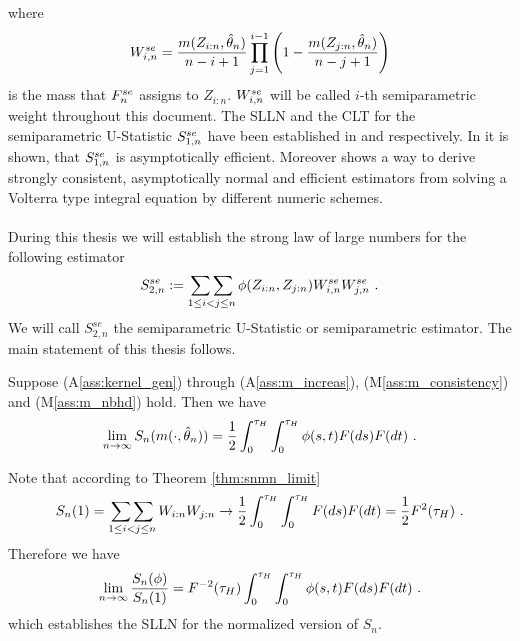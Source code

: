 where 
$$W_{i,n}^{se} = \frac{m(Z_{i:n}, \hat{\theta}_n)}{n-i+1} \prod\limits_{j=1}^{i-1}\left(1-\frac{m(Z_{j:n}, \hat{\theta}_n)}{n-j+1}\right)$$
is the mass that $F_n^{se}$ assigns to $Z_{i:n}$. $W_{i,n}^{se}$ will be called $i$-th semiparametric weight throughout this document. The SLLN and the CLT for the semiparametric U-Statistic $S_{1,n}^{se}$ have been established in \citet{dikta2000strong} and \citet{dikta2005central} respectively. In \cite{dikta2014efficient} it is shown, that  $S_{1,n}^{se}$ is asymptotically efficient. Moreover \cite{dikta2016volterra} shows a way to derive strongly consistent, asymptotically normal and efficient estimators from solving a Volterra type integral equation by different numeric schemes.\\
\\
During this thesis we will establish the strong law of large numbers for the following estimator
$$S_{2,n}^{se} := \mathop{\sum\sum}\limits_{1\leq i<j\leq n}\phi(Z_{i:n}, Z_{j:n})W_{i,n}^{se}W_{j,n}^{se}\textrm{ .}$$
We will call $S_{2,n}^{se}$ the semiparametric U-Statistic or semiparametric estimator. The main statement of this thesis follows.
\begin{thm}
	Suppose (A\ref{ass:kernel_gen}) through (A\ref{ass:m_increas}), (M\ref{ass:m_consistency}) and (M\ref{ass:m_nbhd}) hold. Then we have
	$$\lim\limits_{n\to\infty} S_n(m(\cdot, \hat{\theta}_n)) = \frac{1}{2}\int_{0}^{\tau_H}\int_{0}^{\tau_H} \phi(s,t) F(ds)F(dt)\textrm{ .}$$
	\label{thm:snmn_limit}
\end{thm}
%
\begin{remark}
	Note that according to Theorem \ref{thm:snmn_limit} 
	\begin{equation*}
	S_n(1) = \mathop{\sum\sum}\limits_{1\leq i<j \leq n} W_{i:n} W_{j:n} \to  \frac{1}{2}\int_{0}^{\tau_H} \int_{0}^{\tau_H} F(ds)F(dt) = \frac{1}{2} F^{2}(\tau_H)\textrm{ .}
	\end{equation*}
	Therefore we have 
	\begin{equation*}
	\lim\limits_{n\to\infty}\frac{S_n(\phi)}{S_n(1)} = F^{-2}(\tau_H) \int_{0}^{\tau_H} \int_{0}^{\tau_H} \phi(s,t)F(ds)F(dt)\textrm{ .}
	\end{equation*}
	which establishes the SLLN for the normalized version of $S_n$.
\end{remark}
%
%
